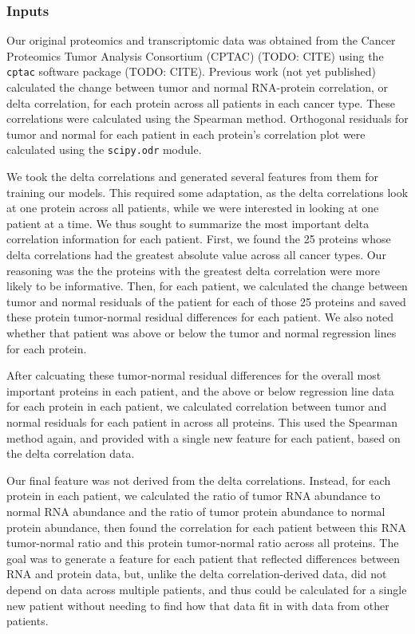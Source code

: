 \documentclass{article}
\begin{document}
\subsubsection{Inputs}

Our original proteomics and transcriptomic data was obtained from the Cancer Proteomics Tumor Analysis Consortium (CPTAC) (TODO: CITE) using the \texttt{cptac} software package (TODO: CITE). Previous work (not yet published) calculated the change between tumor and normal RNA-protein correlation, or delta correlation, for each protein across all patients in each cancer type. These correlations were calculated using the Spearman method. Orthogonal residuals for tumor and normal for each patient in each protein's correlation plot were calculated using the \texttt{scipy.odr} module.

We took the delta correlations and generated several features from them for training our models. This required some adaptation, as the delta correlations look at one protein across all patients, while we were interested in looking at one patient at a time. We thus sought to summarize the most important delta correlation information for each patient. First, we found the 25 proteins whose delta correlations had the greatest absolute value across all cancer types. Our reasoning was the the proteins with the greatest delta correlation were more likely to be informative. Then, for each patient, we calculated the change between tumor and normal residuals of the patient for each of those 25 proteins and saved these protein tumor-normal residual differences for each patient. We also noted whether that patient was above or below the tumor and normal regression lines for each protein.

After calcuating these tumor-normal residual differences for the overall most important proteins in each patient, and the above or below regression line data for each protein in each patient, we calculated correlation between tumor and normal residuals for each patient in across all proteins. This used the Spearman method again, and provided with a single new feature for each patient, based on the delta correlation data.

Our final feature was not derived from the delta correlations. Instead, for each protein in each patient, we calculated the ratio of tumor RNA abundance to normal RNA abundance and the ratio of tumor protein abundance to normal protein abundance, then found the correlation for each patient between this RNA tumor-normal ratio and this protein tumor-normal ratio across all proteins. The goal was to generate a feature for each patient that reflected differences between RNA and protein data, but, unlike the delta correlation-derived data, did not depend on data across multiple patients, and thus could be calculated for a single new patient without needing to find how that data fit in with data from other patients.
\end{document}
